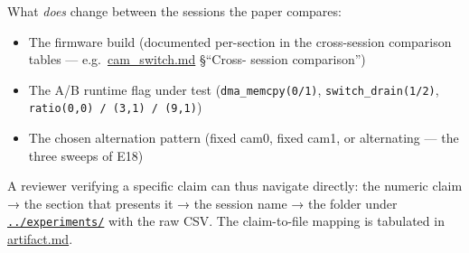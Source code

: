 What \emph{does} change between the sessions the paper compares:

\begin{itemize}
\tightlist
\item
  The firmware build (documented per-section in the cross-session
  comparison tables --- e.g.~\url{cam_switch.md} §``Cross- session
  comparison'')
\item
  The A/B runtime flag under test (\texttt{dma\_memcpy(0/1)},
  \texttt{switch\_drain(1/2)}, \texttt{ratio(0,0)\ /\ (3,1)\ /\ (9,1)})
\item
  The chosen alternation pattern (fixed cam0, fixed cam1, or alternating
  --- the three sweeps of E18)
\end{itemize}

A reviewer verifying a specific claim can thus navigate directly: the
numeric claim → the section that presents it → the session name → the
folder under \href{../experiments/}{\texttt{../experiments/}} with the
raw CSV. The claim-to-file mapping is tabulated in \url{artifact.md}.
